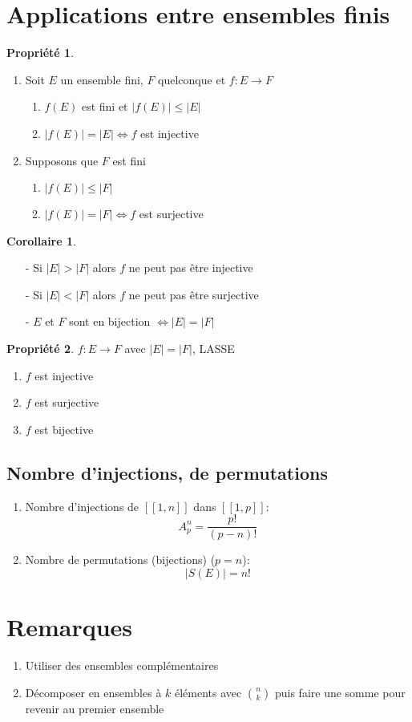 \documentclass[fleqn]{article}
\theoremstyle{definition} \newtheorem*{defi}{D\'efinition}
\theoremstyle{definition} \newtheorem*{theo}{Th\'eor\`eme}
\theoremstyle{definition} \newtheorem*{coro}{Corollaire}
\theoremstyle{remark} \newtheorem*{rqs}{Remarques}
\theoremstyle{definition} \newtheorem*{prop}{Propri\'et\'e}
\begin{document}
\section{Applications entre ensembles finis}
\begin{prop} $ $
	\begin{enumerate}
		\item Soit $E$ un ensemble fini, $F$ quelconque et $f: E \rightarrow F$
			\begin{enumerate}
				\item $f(E)$ est fini et $|f(E)| \leq |E|$
				\item $|f(E)| = |E| \Leftrightarrow f$ est injective
			\end{enumerate}

		\item Supposons que $F$ est fini
			\begin{enumerate}
				\item $|f(E)| \leq |F|$
				\item $|f(E)| = |F| \Leftrightarrow f$ est surjective
			\end{enumerate}
	\end{enumerate}
\end{prop}

\begin{coro} $ $
	\begin{itemize}
		\item [-] Si $|E| > |F|$ alors $f$ ne peut pas \^etre injective
		\item [-] Si $|E| < |F|$ alors $f$ ne peut pas \^etre surjective
		\item [-] $E$ et $F$ sont en bijection $\Leftrightarrow |E| = |F|$
	\end{itemize}
\end{coro}

\begin{prop} $f: E \rightarrow F$ avec $|E| = |F|$, LASSE
	\begin{enumerate}
		\item $f$ est injective
		\item $f$ est surjective
		\item $f$ est bijective
	\end{enumerate}
\end{prop}

\subsection{Nombre d'injections, de permutations}
\begin{enumerate}
	\item Nombre d'injections de $[\![1,n]\!]$ dans $[\![1,p]\!]$:
		\[A_p^n = \frac{p!}{(p-n)!}\]
	\item Nombre de permutations (bijections) ($p=n$):
		\[|S(E)| = n!\]
\end{enumerate}

\section{Remarques}
\begin{enumerate}
	\item Utiliser des ensembles compl\'ementaires
	\item D\'ecomposer en ensembles \`a $k$ \'el\'ements avec $\binom{n}{k}$ puis faire une somme pour revenir au premier ensemble
\end{enumerate}
\end{document}
